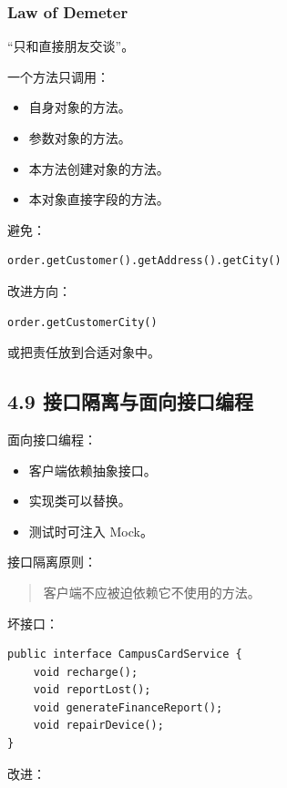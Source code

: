 \documentclass[UTF8,zihao=-4]{ctexart}
\begin{document}
\subsubsection{Law of Demeter}

“只和直接朋友交谈”。

一个方法只调用：

\begin{itemize}
\item 自身对象的方法。
\item 参数对象的方法。
\item 本方法创建对象的方法。
\item 本对象直接字段的方法。
\end{itemize}

避免：

\small
\begin{verbatim}
order.getCustomer().getAddress().getCity()
\end{verbatim}
\normalsize

改进方向：

\small
\begin{verbatim}
order.getCustomerCity()
\end{verbatim}
\normalsize

或把责任放到合适对象中。

\subsection{4.9 接口隔离与面向接口编程}

面向接口编程：

\begin{itemize}
\item 客户端依赖抽象接口。
\item 实现类可以替换。
\item 测试时可注入 Mock。
\end{itemize}

接口隔离原则：

\begin{quote}
客户端不应被迫依赖它不使用的方法。
\end{quote}

坏接口：

\small
\begin{verbatim}
public interface CampusCardService {
    void recharge();
    void reportLost();
    void generateFinanceReport();
    void repairDevice();
}
\end{verbatim}
\normalsize

改进：
\end{document}
